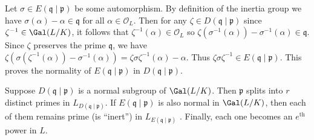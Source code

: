 \documentclass[11pt,letterpaper]{article}
\begin{document}
\begin{solution}
    Let $\sigma\in E(\mathfrak{q}\mid \mathfrak{p})$ be some automorphism. By definition of the inertia group we have $\sigma(\alpha)-\alpha\in \mathfrak{q}$ for all $\alpha\in \mathcal{O}_L$. Then for any $\zeta\in D(\mathfrak{q}\mid \mathfrak{p})$ since $\zeta^{-1}\in \Gal(L /K)$, it follows that $\zeta^{-1}(\alpha)\in \mathcal{O}_L$ so $\zeta(\sigma^{-1}(\alpha))-\sigma^{-1}(\alpha)\in \mathfrak{q}$. Since $\zeta$ preserves the prime $\mathfrak{q}$, we have $\zeta(\sigma(\zeta^{-1}(\alpha))-\sigma^{-1}(\alpha))=\zeta\sigma\zeta^{-1}(\alpha)-\alpha$. Thus $\zeta\sigma\zeta^{-1}\in E(\mathfrak{q}\mid \mathfrak{p})$. This proves the normality of $E(\mathfrak{q}\mid \mathfrak{p})$ in $D(\mathfrak{q}\mid \mathfrak{p})$.
\end{solution}

\begin{cproblem}{4.2}
    Suppose $D(\mathfrak{q}\mid \mathfrak{p})$ is a normal subgroup of $\Gal(L/K)$. Then $\mathfrak{p}$ splits into $r$ distinct primes in $L_{D(\mathfrak{q}\mid \mathfrak{p})}$. If $E(\mathfrak{q}\mid \mathfrak{p})$ is also normal in $\Gal(L /K)$, then each of them remains prime (is ``inert'') in $L_{E(\mathfrak{q}\mid \mathfrak{p})}$ . Finally, each one becomes an $e^{\text{th}}$ power in $L$.
\end{cproblem}
\end{document}
